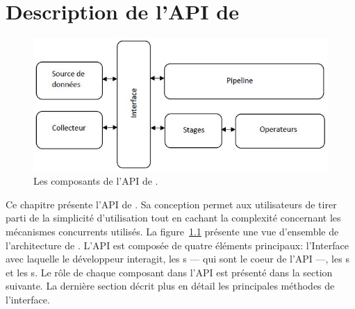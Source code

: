 
\chapter{Description de l'API de \PpFf}
\label{description.chap}



\begin{figure}[ht]
\centering
     \includegraphics[width=1.0\textwidth]{Figures/ComponentsAPI.jpg}
      \caption{Les composants de l'API de \ppff.}
       \label{ComponentsAPI.fig}
\end{figure}




Ce chapitre pr\'esente l'API de \ppff. Sa conception permet aux utilisateurs de tirer parti de la simplicit\'e d'utilisation tout en cachant la complexit\'e concernant les m\'ecanismes concurrents utilis\'es. La figure~\ref{ComponentsAPI.fig} pr\'esente une vue d'ensemble de l'architecture de \ppff. L'API est compos\'ee de quatre \'el\'ements principaux: l'Interface avec laquelle le d\'eveloppeur interagit, les s --- qui sont le coeur de l'API ---, les s et les s. Le r\^ole de chaque composant dans l'API est pr\'esent\'e dans la section suivante. La derni\`ere section  d\'ecrit plus en d\'etail les principales m\'ethodes de l'interface.

